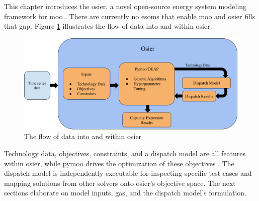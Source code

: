 
This chapter introduces the \acf{osier}, a novel open-source energy system modeling
framework for \acl{moo} \cite{dotson_osier_2024}. There are currently no
\acp{esom} that enable \ac{moo} and \ac{osier} fills that gap. Figure 
\ref{fig:osier_flow} illustrates the flow of data into and within \ac{osier}.

\begin{figure}[H]
    \centering
    \includegraphics[width=\columnwidth]{figures/03_osier_chapter/osier_flow}
    \caption{The flow of data into and within \ac{osier}}
    \label{fig:osier_flow}
\end{figure}

Technology data, objectives, constraints, and a dispatch model are all features
within \ac{osier}, while \ac{pymoo} drives the optimization of these objectives \cite{blank_pymoo_2020}.
The dispatch model is independently executable for inspecting specific test
cases and mapping solutions from other solvers onto \ac{osier}'s objective
space. The next sections elaborate on model inputs, \acfp{ga}, and the dispatch model's 
formulation.






